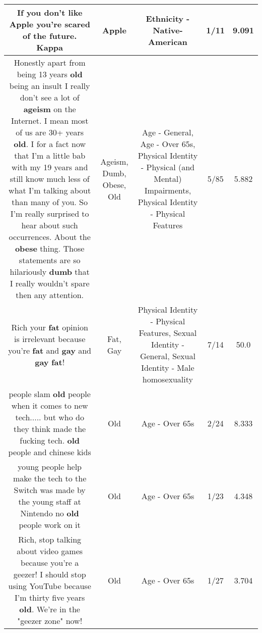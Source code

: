 \documentclass[11pt]{article}
\newlength\mylength
\begin{document}
\begin{center}
\begin{longtable}{|C{.65\mylength}|C{.30\mylength}|C{.12\mylength}|C{.12\mylength}|C{.12\mylength}|}
  \small If you don't like \textbf{Apple} you're scared of the future. Kappa\normalsize   & Apple & Ethnicity - Native-American & 1/11 & 9.091 \\  \hline
  \small Honestly apart from being 13 years \textbf{old} being an insult I really don't see a lot of \textbf{ageism} on the Internet. I mean most of us are 30+ years \textbf{old}. I for a fact now that I'm a little bab with my 19 years and still know much less of what I'm talking about than many of you. So I'm really surprised to hear about such occurrences. About the \textbf{obese} thing. Those statements are so hilariously \textbf{dumb} that I really wouldn't spare then any attention.\normalsize   & Ageism, Dumb, Obese, Old & Age - General, Age - Over 65s, Physical Identity - Physical (and Mental) Impairments, Physical Identity - Physical Features & 5/85 & 5.882 \\  \hline
  \small Rich your \textbf{fat} opinion is irrelevant because you're \textbf{fat} and \textbf{g\textbf{ay}} and \textbf{g\textbf{ay}} \textbf{fat}!\normalsize   & Fat, Gay & Physical Identity - Physical Features, Sexual Identity - General, Sexual Identity - Male homosexuality & 7/14 & 50.0 \\  \hline
  \small people slam \textbf{old} people when it comes to new tech..... but who do they think made the fucking tech. \textbf{old} people and chinese kids\normalsize   & Old & Age - Over 65s & 2/24 & 8.333 \\  \hline
  \small young  people help make the tech to the Switch was made by the young staff at Nintendo no \textbf{old} people work on it\normalsize   & Old & Age - Over 65s & 1/23 & 4.348 \\  \hline
  \small Rich, stop talking about video games because you're a geezer! I should stop using YouTube because I'm thirty five years \textbf{old}. We're in the "geezer zone"  now!\normalsize   & Old & Age - Over 65s & 1/27 & 3.704 \\  \hline

\end{longtable}
\end{center}
\end{document}
